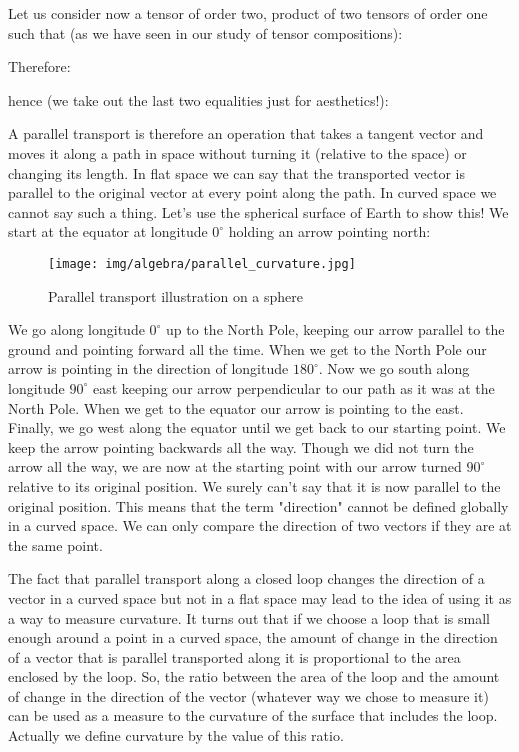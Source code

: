 	Let us consider now a tensor of order two, product of two tensors of order one such that (as we have seen in our study of tensor compositions):
	
	Therefore:
	
	hence (we take out the last two equalities just for aesthetics!):
	
	A parallel transport is therefore an operation that takes a tangent vector and moves it along a path in space without turning it (relative to the space) or changing its length. In flat space we can say that the transported vector is parallel to the original vector at every point along the path. In curved space we cannot say such a thing. Let's use the spherical surface of Earth to show this! We start at the equator at longitude $0^\circ$ holding an arrow pointing north:
	\begin{figure}[H]
		\centering
		\texttt{[image: img/algebra/parallel\_curvature.jpg]}
		\caption{Parallel transport illustration on a sphere}
	\end{figure}
	We go along longitude $0^\circ$ up to the North Pole, keeping our arrow parallel to the ground and pointing forward all the time. When we get to the North Pole our arrow is pointing in the direction of longitude $180^\circ$. Now we go south along longitude $90^\circ$ east keeping our arrow perpendicular to our path as it was at the North Pole. When we get to the equator our arrow is pointing to the east. Finally, we go west along the equator until we get back to our starting point. We keep the arrow pointing backwards all the way. Though we did not turn the arrow all the way, we are now at the starting point with our arrow turned $90^\circ$ relative to its original position. We surely can't say that it is now parallel to the original position. This means that the term "direction" cannot be defined globally in a curved space. We can only compare the direction of two vectors if they are at the same point.

	The fact that parallel transport along a closed loop changes the direction of a vector in a curved space but not in a flat space may lead to the idea of using it as a way to measure curvature. It turns out that if we choose a loop that is small enough around a point in a curved space, the amount of change in the direction of a vector that is parallel transported along it is proportional to the area enclosed by the loop. So, the ratio between the area of the loop and the amount of change in the direction of the vector (whatever way we chose to measure it) can be used as a measure to the curvature of the surface that includes the loop. Actually we define curvature by the value of this ratio.
	
